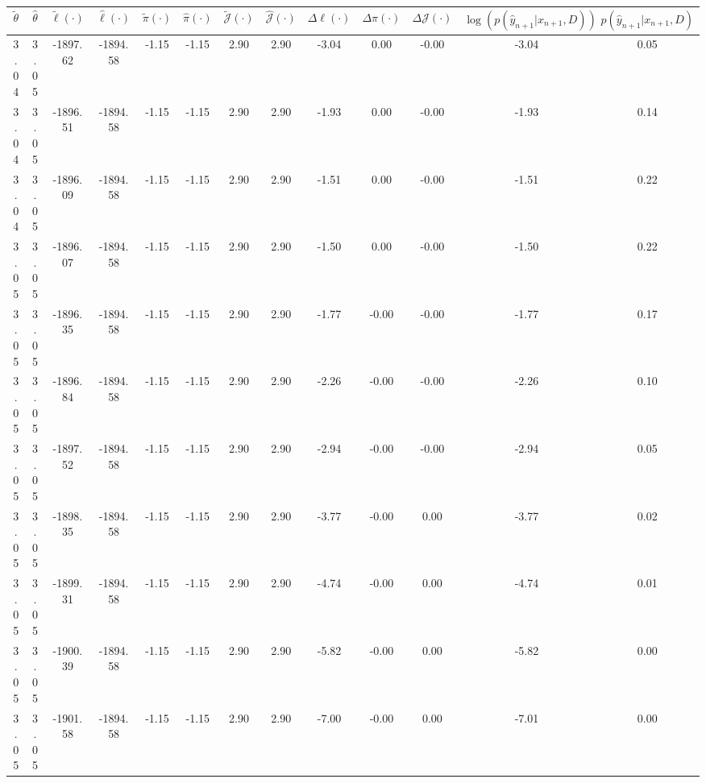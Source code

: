 \begin{table}[htbp]
        \centering
        \tiny
        \begin{adjustbox}{angle=90}
            \begin{tabular}{|c|c|c|c|c|c|c|c|c|c|c|c|c|}
                \hline
                 $\tilde{\theta}$ & $\hat{\theta}$ & $\tilde{\ell}(\cdot)$ & $\hat{\ell}(\cdot)$ & $\tilde{\pi}(\cdot)$ & $\hat{\pi}(\cdot)$ & $\tilde{\mathcal{J}}(\cdot)$ & $\hat{\mathcal{J}}(\cdot)$ & $\Delta \ell(\cdot)$ & $\Delta \pi(\cdot)$ & $\Delta \mathcal{J}(\cdot)$ & $\log(p(\hat{y}_{n+1}|x_{n+1}, D))$ & $p(\hat{y}_{n+1}|x_{n+1}, D)$ \\
                \hline
                 3.04 & 3.05 & -1897.62 & -1894.58 & -1.15 & -1.15 & 2.90 & 2.90 & -3.04 & 0.00 & -0.00 & -3.04 & 0.05\\ \hline
 3.04 & 3.05 & -1896.51 & -1894.58 & -1.15 & -1.15 & 2.90 & 2.90 & -1.93 & 0.00 & -0.00 & -1.93 & 0.14\\ \hline
 3.04 & 3.05 & -1896.09 & -1894.58 & -1.15 & -1.15 & 2.90 & 2.90 & -1.51 & 0.00 & -0.00 & -1.51 & 0.22\\ \hline
 3.05 & 3.05 & -1896.07 & -1894.58 & -1.15 & -1.15 & 2.90 & 2.90 & -1.50 & 0.00 & -0.00 & -1.50 & 0.22\\ \hline
 3.05 & 3.05 & -1896.35 & -1894.58 & -1.15 & -1.15 & 2.90 & 2.90 & -1.77 & -0.00 & -0.00 & -1.77 & 0.17\\ \hline
 3.05 & 3.05 & -1896.84 & -1894.58 & -1.15 & -1.15 & 2.90 & 2.90 & -2.26 & -0.00 & -0.00 & -2.26 & 0.10\\ \hline
 3.05 & 3.05 & -1897.52 & -1894.58 & -1.15 & -1.15 & 2.90 & 2.90 & -2.94 & -0.00 & -0.00 & -2.94 & 0.05\\ \hline
 3.05 & 3.05 & -1898.35 & -1894.58 & -1.15 & -1.15 & 2.90 & 2.90 & -3.77 & -0.00 & 0.00 & -3.77 & 0.02\\ \hline
 3.05 & 3.05 & -1899.31 & -1894.58 & -1.15 & -1.15 & 2.90 & 2.90 & -4.74 & -0.00 & 0.00 & -4.74 & 0.01\\ \hline
 3.05 & 3.05 & -1900.39 & -1894.58 & -1.15 & -1.15 & 2.90 & 2.90 & -5.82 & -0.00 & 0.00 & -5.82 & 0.00\\ \hline
 3.05 & 3.05 & -1901.58 & -1894.58 & -1.15 & -1.15 & 2.90 & 2.90 & -7.00 & -0.00 & 0.00 & -7.01 & 0.00\\ \hline
            \end{tabular}
        \end{adjustbox}
        \caption{}
        \label{}
    \end{table}
    